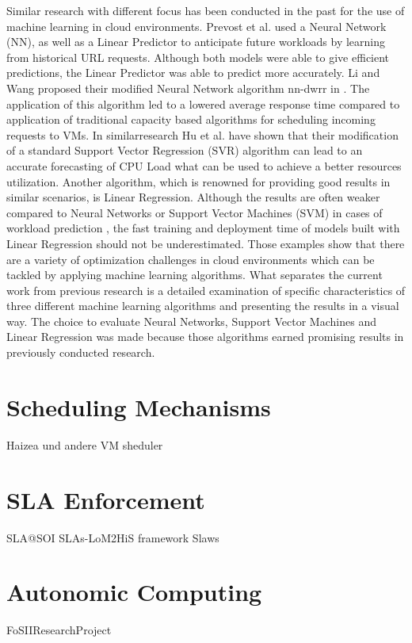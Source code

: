 Similar research with different focus has been conducted in the past for the use of machine learning in cloud environments. Prevost et al. used a Neural Network (NN), as well as a Linear Predictor \cite{prevost2011prediction} to anticipate future workloads by learning from historical URL requests. Although both models were able to give efficient predictions, the Linear Predictor was able to predict more accurately. Li and Wang proposed their modified Neural Network algorithm nn-dwrr in \cite{li2014sla}. The application of this algorithm led to a lowered average response time compared to application of traditional capacity based algorithms for scheduling incoming requests to VMs. In similarresearch Hu et al. \cite{hu2013kswsvr} have shown that their modification of a standard Support Vector Regression (SVR) algorithm can lead to an accurate forecasting of CPU Load what can be used to achieve a better resources utilization. Another algorithm, which is renowned for providing good results in similar scenarios, is Linear Regression. Although the results are often weaker compared to Neural Networks or Support Vector Machines (SVM) in cases of workload prediction \cite{bankole2013predicting} \cite{imam2011neural}, the fast training and deployment time of models built with Linear Regression should not be underestimated. Those examples show that there are a variety of optimization challenges in cloud environments which can be tackled by applying machine learning algorithms. What separates the current work from previous research is a detailed examination of specific characteristics of three different machine learning algorithms and presenting the results in a visual way. The choice to evaluate Neural Networks, Support Vector Machines and Linear Regression was made because those algorithms earned promising results in previously conducted research.


\section{Scheduling Mechanisms}
Haizea und andere VM sheduler

\section{SLA Enforcement}
SLA@SOI
SLAs-LoM2HiS framework
Slaws
\section{Autonomic Computing}
FoSIIResearchProject

